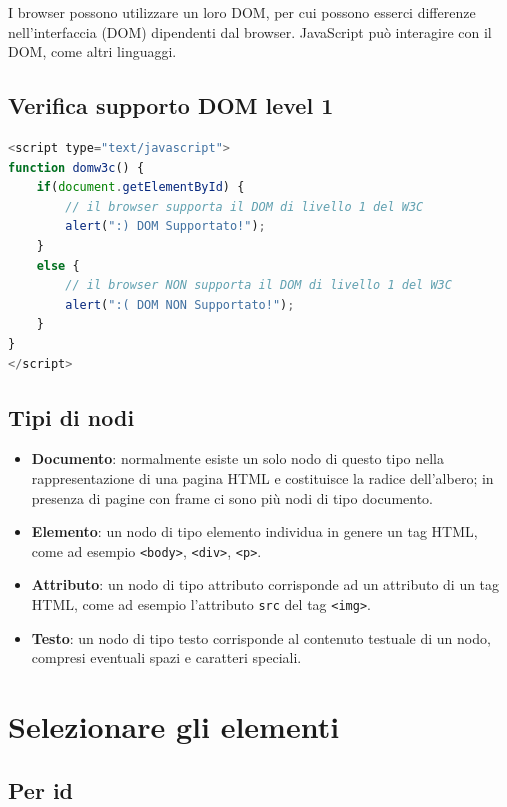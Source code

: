 I browser possono utilizzare un loro DOM, per cui possono esserci differenze nell'interfaccia (DOM) dipendenti dal browser. JavaScript può interagire con il DOM, come altri linguaggi.

\subsection{Verifica supporto DOM level 1}

\begin{lstlisting}[language=JavaScript]
<script type="text/javascript">
function domw3c() {
    if(document.getElementById) {
        // il browser supporta il DOM di livello 1 del W3C
        alert(":) DOM Supportato!");
    }
    else {
        // il browser NON supporta il DOM di livello 1 del W3C
        alert(":( DOM NON Supportato!");
    }
}
</script>
\end{lstlisting}

\subsection{Tipi di nodi}

\begin{itemize}
    \item \textbf{Documento}: normalmente esiste un solo nodo di questo tipo nella rappresentazione di una pagina HTML e costituisce la radice dell'albero; in presenza di pagine con frame ci sono più nodi di tipo documento.
    \item \textbf{Elemento}: un nodo di tipo elemento individua in genere un tag HTML, come ad esempio \texttt{<body>}, \texttt{<div>}, \texttt{<p>}.
    \item \textbf{Attributo}: un nodo di tipo attributo corrisponde ad un attributo di un tag HTML, come ad esempio l'attributo \texttt{src} del tag \texttt{<img>}.
    \item \textbf{Testo}: un nodo di tipo testo corrisponde al contenuto testuale di un nodo, compresi eventuali spazi e caratteri speciali.
\end{itemize}

\section{Selezionare gli elementi}

\subsection{Per id}


